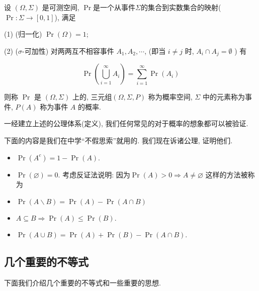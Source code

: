\documentclass{ctexart}
\begin{document}
\begin{definition}
    设 $(\Omega, \Sigma)$ 是可测空间, $\Pr$是一个从事件$\Sigma$的集合到实数集合的映射($\Pr:\Sigma\to [0,1]$), 满足

(1) (归一化) $\Pr(\Omega)=1$;


(2) ($\sigma$-可加性) 对两两互不相容事件 $A_{1}, A_{2}, \cdots$, (即当 $i \neq j$ 时, $A_{i} \cap A_{j}=\emptyset$ ) 有

$$
\Pr\left(\bigcup_{i=1}^{\infty} A_{i}\right)=\sum_{i=1}^{\infty} \Pr\left(A_{i}\right)
$$

则称 $\Pr$ 是 $(\Omega, \Sigma)$ 上的, 三元组$(\Omega, \Sigma, P)$ 称为概率空间, $\Sigma$ 中的元素称为事件, $P(A)$ 称为事件 $A$ 的概率.
\end{definition}

一经建立上述的公理体系(定义), 我们任何常见的对于概率的想象都可以被验证. 

\begin{example}
    下面的内容是我们在中学``不假思索''就用的. 我们现在诉诸公理, 证明他们.

    \begin{itemize}
        \item $\operatorname{Pr}\left(A^c\right)=1-\operatorname{Pr}(A)$. 
        \item $\operatorname{Pr}(\varnothing)=0$. 考虑反证法说明: 因为$\operatorname{Pr}(A)>0 \Longrightarrow A \neq \varnothing$ 这样的方法被称为
        \item $\operatorname{Pr}(A \backslash B)=\operatorname{Pr}(A)-\operatorname{Pr}(A \cap B)$ 
        \item $A \subseteq B \Longrightarrow \operatorname{Pr}(A) \leq \operatorname{Pr}(B)$. 
        \item $\operatorname{Pr}(A \cup B)=\operatorname{Pr}(A)+\operatorname{Pr}(B)-\operatorname{Pr}(A \cap B). $
    \end{itemize}
\end{example}

\subsection{几个重要的不等式} 下面我们介绍几个重要的不等式和一些重要的思想.  
\end{document}
